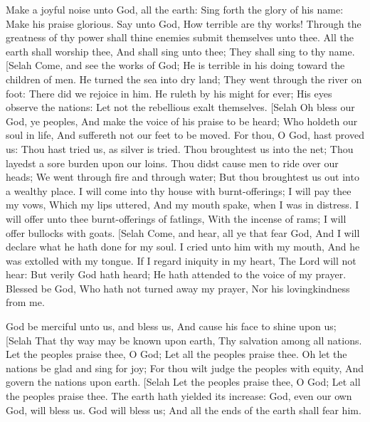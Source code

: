 Make a joyful noise unto God, all the earth:  Sing forth the glory of his name: Make his praise glorious.  Say unto God, How terrible are thy works! Through the greatness of thy power shall thine enemies submit themselves unto thee.  All the earth shall worship thee, And shall sing unto thee; They shall sing to thy name. [Selah  Come, and see the works of God; He is terrible in his doing toward the children of men.  He turned the sea into dry land; They went through the river on foot: There did we rejoice in him.  He ruleth by his might for ever; His eyes observe the nations: Let not the rebellious exalt themselves. [Selah  Oh bless our God, ye peoples, And make the voice of his praise to be heard;  Who holdeth our soul in life, And suffereth not our feet to be moved.  For thou, O God, hast proved us: Thou hast tried us, as silver is tried.  Thou broughtest us into the net; Thou layedst a sore burden upon our loins.  Thou didst cause men to ride over our heads; We went through fire and through water; But thou broughtest us out into a wealthy place.  I will come into thy house with burnt-offerings; I will pay thee my vows,  Which my lips uttered, And my mouth spake, when I was in distress.  I will offer unto thee burnt-offerings of fatlings, With the incense of rams; I will offer bullocks with goats. [Selah  Come, and hear, all ye that fear God, And I will declare what he hath done for my soul.  I cried unto him with my mouth, And he was extolled with my tongue.  If I regard iniquity in my heart, The Lord will not hear:  But verily God hath heard; He hath attended to the voice of my prayer.  Blessed be God, Who hath not turned away my prayer, Nor his lovingkindness from me. 

God be merciful unto us, and bless us, And cause his face to shine upon us; [Selah  That thy way may be known upon earth, Thy salvation among all nations.  Let the peoples praise thee, O God; Let all the peoples praise thee.  Oh let the nations be glad and sing for joy; For thou wilt judge the peoples with equity, And govern the nations upon earth. [Selah  Let the peoples praise thee, O God; Let all the peoples praise thee.  The earth hath yielded its increase: God, even our own God, will bless us.  God will bless us; And all the ends of the earth shall fear him. 

